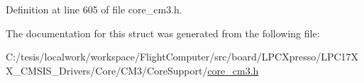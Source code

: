 \-Definition at line 605 of file core\-\_\-cm3.\-h.



\-The documentation for this struct was generated from the following file\-:\begin{DoxyCompactItemize}
\item 
\-C\-:/tesis/localwork/workspace/\-Flight\-Computer/src/board/\-L\-P\-C\-Xpresso/\-L\-P\-C17\-X\-X\-\_\-\-C\-M\-S\-I\-S\-\_\-\-Drivers/\-Core/\-C\-M3/\-Core\-Support/\hyperlink{core__cm3_8h}{core\-\_\-cm3.\-h}\end{DoxyCompactItemize}
